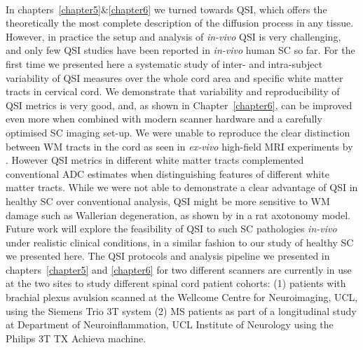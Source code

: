 \paragraph{}
In chapters~\ref{chapter5}\&\ref{chapter6} we turned towards \gls{QSI}, which offers the theoretically the most complete description of the diffusion process in any tissue. However, in practice the setup and analysis of \emph{in-vivo} \gls{QSI} is very challenging, and only few \gls{QSI} studies have been reported in \emph{in-vivo} human {\gls{SC}} so far. For the first time we presented here a systematic study of inter- and intra-subject variability of \gls{QSI} measures over the whole cord area and specific white matter tracts in cervical cord. We demonstrate that variability and reproducibility of \gls{QSI} metrics is very good, and, as shown in Chapter~\ref{chapter6}, can be improved even more when combined with modern scanner hardware and a carefully optimised \gls{SC} imaging set-up. We were unable to reproduce the clear distinction between WM tracts in the cord as seen in \emph{ex-vivo} high-field MRI experiments by \citet{Ong:2012}. However \gls{QSI} metrics in different white matter tracts complemented conventional \gls{ADC} estimates when distinguishing features of different white matter tracts. While we were not able to demonstrate a clear advantage of \gls{QSI} in healthy SC over conventional analysis, \gls{QSI} might be more sensitive to WM damage such as Wallerian degeneration, as shown by \citet{Farrell:2010} in a rat axotonomy model. Future work will explore the feasibility of \gls{QSI} to such SC pathologies \emph{in-vivo} under realistic clinical conditions, in a similar fashion to our study of healthy SC we presented here. The \gls{QSI} protocols and analysis pipeline we presented in chapters~\ref{chapter5} and \ref{chapter6} for two different scanners are currently in use at the two sites to study different spinal cord patient cohorts: (1) patients with brachial plexus avulsion scanned at the Wellcome Centre for Neuroimaging, UCL, using the Siemens Trio 3T system (2) \gls{MS} patients as part of a longitudinal study at Department of Neuroinflammation, UCL Institute of Neurology using the Philips 3T TX Achieva machine.

